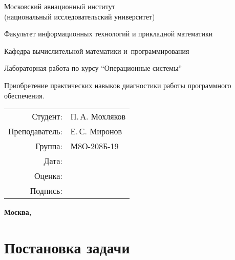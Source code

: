 \documentclass[pdf, unicode, 12pt, a4paper,oneside,fleqn]{article}
\begin{document}
\begin{titlepage}
    \begin{center}
        \bfseries

        {\Large Московский авиационный институт\\ (национальный исследовательский университет)}
        
        \vspace{48pt}
        
        {\large Факультет информационных технологий и прикладной математики}
        
        \vspace{36pt}
        
        {\large Кафедра вычислительной математики и~программирования}
        
        \vspace{48pt}
        
        Лабораторная работа  по курсу \enquote{Операционные системы}

        \vspace{48pt}

        Приобретение практических навыков диагностики работы программного обеспечения.
    \end{center}
    
    \vspace{150pt}
    
    \begin{flushright}
    \begin{tabular}{rl}
    Студент: & П.\,А. Мохляков \\
    Преподаватель: & Е.\,С. Миронов \\
    Группа: & М8О-208Б-19 \\
    Дата: & \\
    Оценка: & \\
    Подпись: & \\
    \end{tabular}
    \end{flushright}
    
    \vfill
    
    \begin{center}
    \bfseries
    Москва, \the\year
    \end{center}
\end{titlepage}
    
\pagebreak

\section{Постановка задачи}
\end{document}
